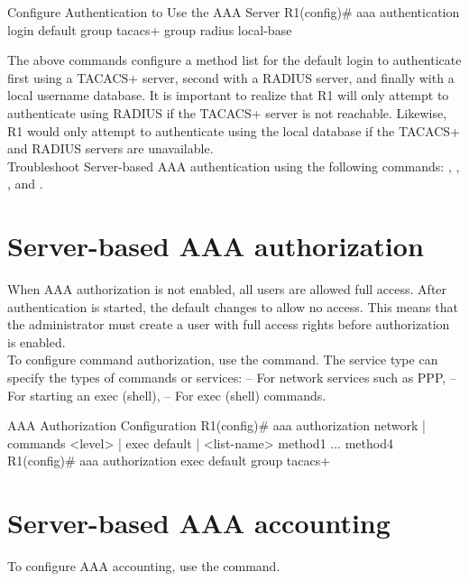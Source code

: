 \begin{sexylisting}{Configure Authentication to Use the AAA Server}
R1(config)# aaa authentication login default group tacacs+ group radius local-base
\end{sexylisting}

The above commands configure a method list for the default login to authenticate first using a TACACS+ server, second with a RADIUS server, and finally with a local username database. It is important to realize that R1 will only attempt to authenticate using RADIUS if the TACACS+ server is not reachable. Likewise, R1 would only attempt to authenticate using the local database if the TACACS+ and RADIUS servers are unavailable.\\

Troubleshoot Server-based AAA authentication using the following commands: , , , and .

\section{Server-based AAA authorization}

When AAA authorization is not enabled, all users are allowed full access. After authentication is started, the default changes to allow no access. This means that the administrator must create a user with full access rights before authorization is enabled. \\

To configure command authorization, use the  command. The service type can specify the types of commands or services:
 -- For network services such as PPP,  -- For starting an exec (shell),  -- For exec (shell) commands. 

\begin{sexylisting}{AAA Authorization Configuration}
R1(config)# aaa authorization {network | commands <level> | exec} {default | <list-name>} method1 ... method4
R1(config)# aaa authorization exec default group tacacs+
\end{sexylisting}

\section{Server-based AAA accounting}

To configure AAA accounting, use the  command. 

